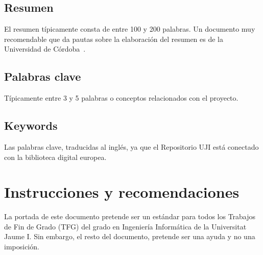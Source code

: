 \documentclass[pdftex,11pt,a4paper]{book}
\begin{document}

\thispagestyle{empty} %

\clearpage %

\section*{Resumen}

El resumen típicamente consta de entre 100 y 200 palabras. Un documento muy recomendable que da pautas sobre la elaboración del resumen es de la Universidad de Córdoba~\cite{bib:elresumen}.

\section*{Palabras clave}

Típicamente entre 3 y 5 palabras o conceptos relacionados con el proyecto.

\section*{Keywords}

Las palabras clave, traducidas al inglés, ya que el Repositorio UJI está conectado con la biblioteca digital europea. 

\thispagestyle{empty} %

\cleardoublepage




\pagestyle{plain} %

\tableofcontents

\cleardoublepage





\chapter*{Instrucciones y recomendaciones}

La portada de este documento pretende ser un estándar para todos los Trabajos de Fin de Grado (TFG) del grado en Ingeniería Informática de la Universitat Jaume I. Sin embargo, el resto del documento, pretende ser una ayuda y no una imposición. 
\end{document}
